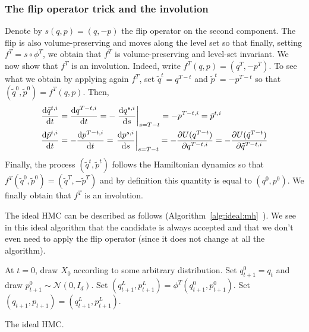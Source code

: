 \documentclass[english,graybox,envcountchap,envcountsame,sectrefs,shortlabels]{svmono}
\theoremstyle{style}
\newcommand{\gauss}{\mathcal{N}}
\begin{document}
\subsubsection{The flip operator trick and the involution}
Denote by $s(q,p)=(q,-p)$ the flip operator on the second component. The flip is also volume-preserving and moves along the level set so that finally, setting $f^T=s \circ \phi^T$, we obtain that $f^T$ is volume-preserving and level-set invariant. We now show that $f^T$ is an involution. Indeed, write $f^T(q,p)=(q^T,-p^T)$. To see what we obtain by applying again $f^T$, set $\tilde q^t=q^{T-t}$ and $\tilde p^t=-p^{T-t}$ so that $(\tilde q^0,\tilde p^0)=f^T(q,p)$. Then,
\begin{align*}
\frac{\mathrm{d} \tilde q^{t,i}}{\mathrm{d} t}&=\frac{\mathrm{d} q^{T-t,i}}{\mathrm{d} t}=-\left. \frac{\mathrm{d} q^{s,i}}{\mathrm{d} s} \right|_{s=T-t}=-p^{T-t,i}=\tilde p^{t,i}\\
\frac{\mathrm{d} \tilde p^{t,i}}{\mathrm{d} t}&=-\frac{\mathrm{d} p^{T-t,i}}{\mathrm{d} t}= \left. \frac{\mathrm{d} p^{s,i}}{\mathrm{d} s} \right|_{s=T-t}=-\frac{\partial U(q^{T-t})}{\partial q^{T-t,i}}=-\frac{\partial U(\tilde q^{T-t})}{\partial \tilde q^{T-t,i}}
\end{align*}
Finally, the process $(\tilde q^t,\tilde p^t)$ follows the Hamiltonian dynamics so that $f^T(\tilde q^0,\tilde p^0)=(\tilde q^T,-\tilde p^T)$ and by definition this quantity is equal to $(q^0,p^0)$. We finally obtain that $f^T$ is an involution.

The ideal HMC can be described as follows (Algorithm~\ref{alg:ideal:mh}~). We see in this ideal algorithm that the candidate is always accepted and that we don't even need to apply the flip operator (since it does not change at all the algorithm).

\begin{algorithm}
\centering
\begin{algorithmic}
\State At $t=0$, draw $X_{0}$ according to some arbitrary distribution.
\State Set $q_{t+1}^0=q_{t}$ and draw $p_{t+1}^0\sim \gauss(0,I_d)$.
\State Set  $(q_{t+1}^L,p_{t+1}^L)=\phi^T(q_{t+1}^0,p_{t+1}^0)$.
\State Set $(q_{t+1},p_{t+1})=(q_{t+1}^L,p_{t+1}^L)$.
\EndFor
\end{algorithmic}
\label{alg:ideal:mh}
\caption{The ideal HMC.}
\end{algorithm}

\end{document}
